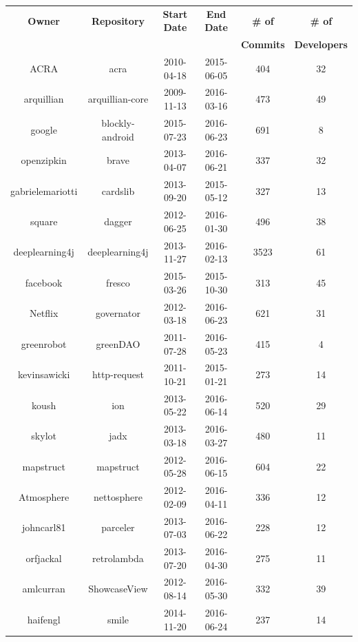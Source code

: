 \begin{table}[!hbp]
\begin{center}
    \begin{tabular}{|c|c|c|c|c|c|}
        \hline
        \textbf{Owner} & \textbf{Repository} & \textbf{Start Date} & \textbf{End Date} & \textbf{\# of} & \textbf{\# of} \\
         & & & & \textbf{Commits} & \textbf{Developers} \\
        \hline
        ACRA & acra & 2010-04-18 & 2015-06-05 & 404 & 32 \\
        arquillian & arquillian-core & 2009-11-13 & 2016-03-16 & 473 & 49 \\
        google & blockly-android & 2015-07-23 & 2016-06-23 & 691 & 8 \\
        openzipkin & brave & 2013-04-07 & 2016-06-21 & 337 & 32 \\
        gabrielemariotti & cardslib & 2013-09-20 & 2015-05-12 & 327 & 13 \\
        square & dagger & 2012-06-25 & 2016-01-30 & 496 & 38 \\
        deeplearning4j & deeplearning4j & 2013-11-27 & 2016-02-13 & 3523 & 61 \\
        facebook & fresco & 2015-03-26 & 2015-10-30 & 313 & 45 \\
        Netflix & governator & 2012-03-18 & 2016-06-23 & 621 & 31 \\
        greenrobot & greenDAO & 2011-07-28 & 2016-05-23 & 415 & 4 \\
        kevinsawicki & http-request & 2011-10-21 & 2015-01-21 & 273 & 14 \\
        koush & ion & 2013-05-22 & 2016-06-14 & 520 & 29 \\
        skylot & jadx & 2013-03-18 & 2016-03-27 & 480 & 11 \\
        mapstruct & mapstruct & 2012-05-28 & 2016-06-15 & 604 & 22 \\
        Atmosphere & nettosphere & 2012-02-09 & 2016-04-11 & 336 & 12 \\
        johncarl81 & parceler & 2013-07-03 & 2016-06-22 & 228 & 12 \\
        orfjackal & retrolambda & 2013-07-20 & 2016-04-30 & 275 & 11 \\
        amlcurran & ShowcaseView & 2012-08-14 & 2016-05-30 & 332 & 39 \\
        haifengl & smile & 2014-11-20 & 2016-06-24 & 237 & 14 \\

\end{tabular}
\end{center}
\end{table}
